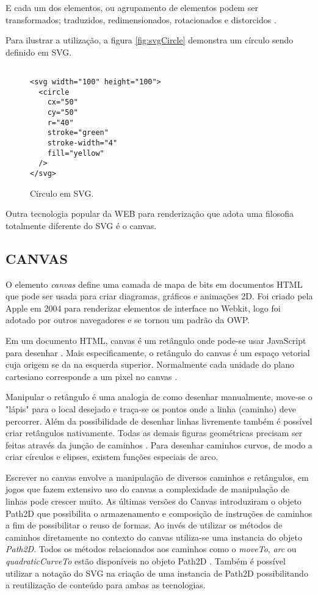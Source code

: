 E cada um dos elementos, ou agrupamento de elementos podem ser
transformados; traduzidos, redimensionados, rotacionados e distorcidos
\autocite[pp. 5]{svgTime}.

Para ilustrar a utilização, a figura \ref{fig:svgCircle} demonstra um
círculo sendo definido em SVG.

\begin{figure}[H]
\centering
\begin{verbatim}

<svg width="100" height="100">
  <circle 
    cx="50" 
    cy="50" 
    r="40" 
    stroke="green" 
    stroke-width="4" 
    fill="yellow" 
  />
</svg>

\end{verbatim}
\caption{Círculo em SVG.}
\label{img:svgCircle}
\end{figure}

Outra tecnologia popular da WEB para renderização que adota uma filosofia totalmente 
diferente do SVG é o canvas.
\subsection{CANVAS}
O elemento \textit{canvas} define uma camada de mapa de bits em
documentos HTML que pode ser usada para criar diagramas, gráficos e
animações 2D. Foi criado pela Apple em 2004 para renderizar elementos
de interface no Webkit, logo foi adotado por outros navegadores e se
tornou um padrão da OWP.

Em um documento HTML, canvas é um retângulo onde pode-se usar
JavaScript para desenhar \autocite[pp. 113]{diveIntohtml}. Mais
especificamente, o retângulo do canvas é um espaço vetorial cuja
origem se da na esquerda superior. Normalmente cada unidade do plano
cartesiano corresponde a um pixel no canvas \autocite{mdnCanvas}.

Manipular o retângulo é uma analogia de como desenhar manualmente,
move-se o "lápis" para o local desejado e traça-se os pontos onde
a linha (caminho) deve percorrer. Além da possibilidade de desenhar
linhas livremente também é possível criar retângulos nativamente.
Todas as demais figuras geométricas precisam ser feitas através da
junção de caminhos \autocite{mdnCanvas}. Para desenhar caminhos
curvos, de modo a criar círculos e elipses, existem funções especiais
de arco.

Escrever no canvas envolve a manipulação de diversos caminhos e
retângulos, em jogos que fazem extensivo uso do canvas a complexidade
de manipulação de linhas pode crescer muito. As últimas versões do
Canvas introduziram o objeto Path2D que possibilita o armazenamento e
composição de instruções de caminhos a fim de possibilitar o reuso
de formas. Ao invés de utilizar os métodos de caminhos diretamente no
contexto do canvas utiliza-se uma instancia do objeto \textit{Path2D}.
Todos os métodos relacionados aos caminhos como o \textit{moveTo},
\textit{arc} ou \textit{quadraticCurveTo} estão disponíveis no
objeto Path2D \autocite{mdnCanvas}. Também é possível utilizar a
notação do SVG na criação de uma instancia de Path2D possibilitando
a reutilização de conteúdo para ambas as tecnologias.

